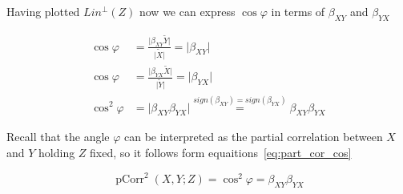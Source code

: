 \documentclass[nobib]{tufte-handout}
\DeclareMathOperator{\pCorr}{pCorr}
\theoremstyle{definition}
\begin{document}
Having plotted $Lin^{\perp}(Z)$ now we can express $\cos \varphi$ in terms of $\beta_{XY}$
and $\beta_{YX}$

\begin{equation}\label{eq:part_cor_cos}
\begin{split}
\cos \varphi &= \frac{\vert \beta_{XY} \widetilde Y \vert}{\vert \widetilde X \vert} = \vert \beta_{XY} \vert \\
\cos \varphi &= \frac{\vert \beta_{YX} \widetilde X \vert}{\vert \widetilde Y \vert} = \vert \beta_{YX} \vert \\
\cos^2 \varphi &= \vert \beta_{XY} \beta_{YX} \vert \stackrel{sign(\beta_{XY}) = sign(\beta_{YX})}{=} \beta_{XY} \beta_{YX}
\end{split}
\end{equation}

Recall that the angle $\varphi$ can be interpreted as the partial correlation
between $X$ and $Y$ holding $Z$ fixed, so it follows form equaitions~\eqref{eq:part_cor_cos}

\[
\pCorr^2(X,Y; Z) = \cos^2 \varphi = \beta_{XY} \beta_{YX}
\]
\end{document}
